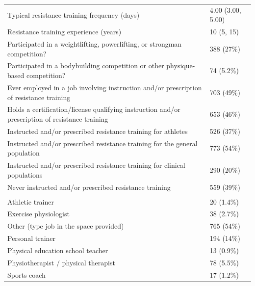 \documentclass[
]{article}
\begin{document}
\begin{longtable}[t]{ll}
Typical resistance training frequency (days) & 4.00 (3.00, 5.00)\\
Resistance training experience (years) & 10 (5, 15)\\
Participated in a weightlifting, powerlifting, or strongman competition? & 388 (27\%)\\
Participated in a bodybuilding competition or other physique-based competition? & 74 (5.2\%)\\
Ever employed in a job involving instruction and/or prescription of resistance training & 703 (49\%)\\
Holds a certification/license qualifying instruction and/or prescription of resistance training & 653 (46\%)\\
Instructed and/or prescribed resistance training for athletes & 526 (37\%)\\
Instructed and/or prescribed resistance training for the general population & 773 (54\%)\\
Instructed and/or prescribed resistance training for clinical populations & 290 (20\%)\\
Never instructed and/or prescribed resistance training & 559 (39\%)\\
\addlinespace[0.3em]
\multicolumn{2}{l}{Current or most recent job role}\\
\hspace{1em}\hspace{1em}Athletic trainer & 20 (1.4\%)\\
\hspace{1em}\hspace{1em}Exercise physiologist & 38 (2.7\%)\\
\hspace{1em}\hspace{1em}Other (type job in the space provided) & 765 (54\%)\\
\hspace{1em}\hspace{1em}Personal trainer & 194 (14\%)\\
\hspace{1em}\hspace{1em}Physical education school teacher & 13 (0.9\%)\\
\hspace{1em}\hspace{1em}Physiotherapist / physical therapist & 78 (5.5\%)\\
\hspace{1em}\hspace{1em}Sports coach & 17 (1.2\%)\\

\end{longtable}
\end{document}
